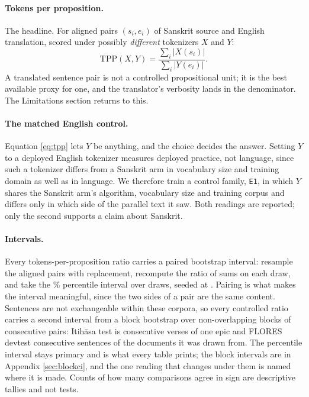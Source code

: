 \documentclass[11pt]{article}
\begin{document}
\paragraph{Tokens per proposition.} The headline. For aligned pairs $(s_i, e_i)$ of
Sanskrit source and English translation, scored under possibly \emph{different}
tokenizers $X$ and $Y$:
\begin{equation}
  \mathrm{TPP}(X, Y) = \frac{\sum_{i} |X(s_i)|}{\sum_{i} |Y(e_i)|}.
  \label{eq:tpp}
\end{equation}
A translated sentence pair is not a controlled propositional unit; it is the best
available proxy for one, and the translator's verbosity lands in the denominator. The
Limitations section returns to this.

\paragraph{The matched English control.} Equation \ref{eq:tpp} lets $Y$ be anything, and
the choice decides the answer. Setting $Y$ to a deployed English tokenizer measures
deployed practice, not language, since such a tokenizer differs from a Sanskrit arm in
vocabulary size and training domain as well as in language. We therefore train a control
family, \texttt{E1}, in which $Y$ shares the Sanskrit arm's algorithm, vocabulary size and
training corpus and differs only in which side of the parallel text it saw. Both readings
are reported; only the second supports a claim about Sanskrit.

\paragraph{Intervals.} Every tokens-per-proposition ratio carries a paired bootstrap
interval: resample the
aligned pairs with replacement, recompute the ratio of sums on each draw, and take the
\numCiLevel{}\% percentile interval over \numBootstrap{} draws, seeded at
\numBootstrapSeed{}. Pairing is what makes the interval meaningful, since the two sides of
a pair are the same content.
Sentences are not exchangeable within these corpora, so every controlled ratio carries a
second interval from a block bootstrap over non-overlapping blocks of \numBlockLength{}
consecutive pairs: Itih\=asa test is consecutive verses of one epic and FLORES devtest
consecutive sentences of the documents it was drawn from. The percentile interval stays
primary and is what every table prints; the block intervals are in Appendix
\ref{sec:blockci}, and the one reading that changes under them is named where it is made.
Counts of how many comparisons agree in sign are descriptive tallies and not tests.
\end{document}
